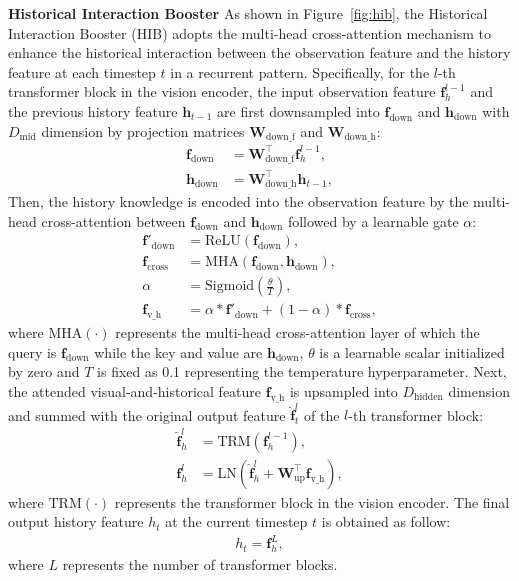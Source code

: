 \documentclass[10pt,twocolumn,letterpaper]{article}
\def\vf{{\bm{f}}}
\def\vh{{\bm{h}}}
\def\mW{{\bm{W}}}
\begin{document}
\noindent\textbf{Historical Interaction Booster}
As shown in Figure~\ref{fig:hib}, the Historical Interaction Booster (HIB) adopts the multi-head cross-attention mechanism to enhance the historical interaction between the observation feature and the history feature at each timestep $t$ in a recurrent pattern.
Specifically, for the $l$-th transformer block in the vision encoder, the input observation feature $\vf_h^{l-1}$ and the previous history feature $\vh_{t-1}$ are first downsampled into $\vf_\text{down}$ and $\vh_\text{down}$ with $D_\text{mid}$ dimension by projection matrices $\mW_{\text{down\_f}}$ and $\mW_{\text{down\_h}}$:
\begin{align} 
\vf_\text{down} &= \mW_{\text{down\_f}}^\intercal \vf_{h}^{l-1}, \label{con:eq5} \\
\vh_\text{down} &= \mW_{\text{down\_h}}^\intercal \vh_{t-1}, \label{con:eq6}
\end{align}
Then, the history knowledge is encoded into the observation feature by the multi-head cross-attention between $\vf_\text{down}$ and $\vh_\text{down}$ followed by a learnable gate $\alpha$: 
\begin{align} 
\vf'_\text{down} &= \text{ReLU}(\vf_\text{down}), \label{con:eq7} \\
\vf_\text{cross} &= \text{MHA}(\vf_\text{down}, \vh_\text{down}), \\
\alpha &= \text{Sigmoid}(\frac{\theta}{T}), \label{con:eq8} \\
\vf_\text{v\_h} &= \alpha\ast\vf'_\text{down} + (1-\alpha)\ast\vf_\text{cross},
\end{align}
where $\text{MHA}(\cdot)$ represents the multi-head cross-attention layer of which the query is $\vf_\text{down}$ while the key and value are $\vh_\text{down}$, $\theta$ is a learnable scalar initialized by zero and $T$ is fixed as 0.1 representing the temperature hyperparameter. 
Next, the attended visual-and-historical feature $\vf_\text{v\_h}$ is upsampled into $D_\text{hidden}$ dimension and summed with the original output feature ${\hat{\vf}}_{t}^{l}$ of the $l$-th transformer block:
\begin{align} 
\hat{{\vf}}_{h}^{l} &= \text{TRM}(\vf_{h}^{l-1}), \\
\vf_{h}^{l} &= \text{LN}(\hat{{\vf}}_{h}^{l} + \mW_{\text{up}}^\intercal\vf_\text{v\_h}),
\end{align}
where $\text{TRM}(\cdot )$ represents the transformer block in the vision encoder. 
The final output history feature $h_{t}$ at the current timestep $t$ is obtained as follow:
\begin{align} 
h_{t} = \vf_{h}^{L},
\end{align}
where $L$ represents the number of transformer blocks.
\end{document}
